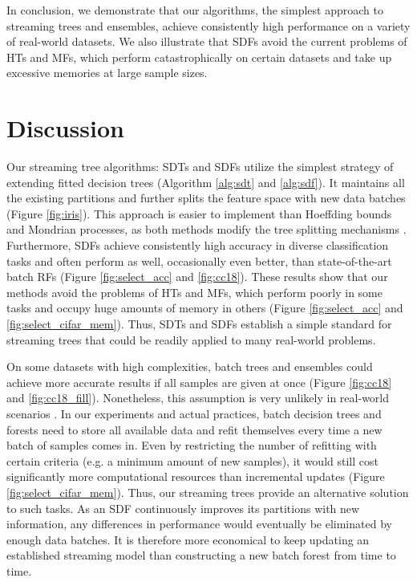 In conclusion, we demonstrate that our algorithms, the simplest approach to streaming trees and ensembles, achieve consistently high performance on a variety of real-world datasets. 
We also illustrate that SDFs avoid the current problems of HTs and MFs, which perform catastrophically on certain datasets and take up excessive memories at large sample sizes. 

\section{Discussion}
\label{discussion}
Our streaming tree algorithms: SDTs and SDFs utilize the simplest strategy of extending fitted decision trees (Algorithm \ref{alg:sdt} and \ref{alg:sdf}). It maintains all the existing partitions and further splits the feature space with new data batches (Figure \ref{fig:iris}). This approach is easier to implement than Hoeffding bounds and Mondrian processes, as both methods modify the tree splitting mechanisms \citep{hoeffding_probability_1994, domingos_mining_2000, roy_mondrian_2009, lakshminarayanan_mondrian_2014}. 
Furthermore, SDFs achieve consistently high accuracy in diverse classification tasks and often perform as well, occasionally even better, than state-of-the-art batch RFs (Figure \ref{fig:select_acc} and \ref{fig:cc18}). These results show that our methods avoid the problems of HTs and MFs, which perform poorly in some tasks and occupy huge amounts of memory in others (Figure \ref{fig:select_acc} and \ref{fig:select_cifar_mem}). Thus, SDTs and SDFs establish a simple standard for streaming trees that could be readily applied to many real-world problems.

On some datasets with high complexities, batch trees and ensembles could achieve more accurate results if all samples are given at once (Figure \ref{fig:cc18} and \ref{fig:cc18_fill}). Nonetheless, this assumption is very unlikely in real-world scenarios \citep{abdulsalam_streaming_2007, liu_isolation_2008}. In our experiments and actual practices, batch decision trees and forests need to store all available data and refit themselves every time a new batch of samples comes in. Even by restricting the number of refitting with certain criteria (e.g. a minimum amount of new samples), it would still cost significantly more computational resources than incremental updates (Figure \ref{fig:select_cifar_mem}). Thus, our streaming trees provide an alternative solution to such tasks. As an SDF continuously improves its partitions with new information, any differences in performance would eventually be eliminated by enough data batches. It is therefore more economical to keep updating an established streaming model than constructing a new batch forest from time to time.


